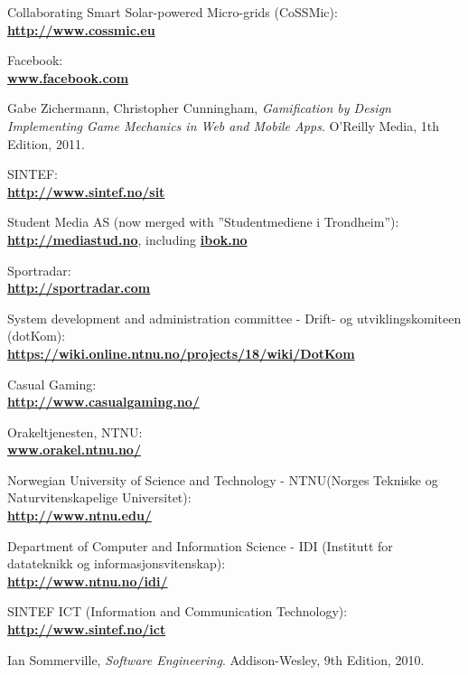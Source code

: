 \begin{thebibliography}{1}

 Collaborating Smart Solar-powered Micro-grids (CoSSMic):\\ \textbf{\url{http://www.cossmic.eu}}

 Facebook: \\
\textbf{ \url{www.facebook.com}}

  Gabe Zichermann, Christopher Cunningham,
  \emph{
Gamification by Design\\
Implementing Game Mechanics in Web and Mobile Apps}.
  O'Reilly Media,
  1th Edition,
  2011.

 SINTEF: \\
\textbf{ \url{ http://www.sintef.no/sit}}

 Student Media AS (now merged with ''Studentmediene i Trondheim''):\\
\textbf{ \url{http://mediastud.no}}, including \textbf{ \url{ibok.no}}

 Sportradar:\\
\textbf{ \url{http://sportradar.com}}

 System development and administration committee - Drift- og utviklingskomiteen (dotKom):\\
\textbf{ \url{https://wiki.online.ntnu.no/projects/18/wiki/DotKom}}

 Casual Gaming:\\
\textbf{ \url{http://www.casualgaming.no/}}

 Orakeltjenesten, NTNU:\\
\textbf{ \url{www.orakel.ntnu.no/}}

 Norwegian University of Science and Technology - NTNU(Norges Tekniske og Naturvitenskapelige Universitet):\\
\textbf{\url{http://www.ntnu.edu/}}

 Department of Computer and Information Science - IDI (Institutt for datateknikk og informasjonsvitenskap):\\
\textbf{ \url{http://www.ntnu.no/idi/}}

 SINTEF ICT (Information and Communication Technology): \\
\textbf{ \url{http://www.sintef.no/ict}}

  Ian Sommerville,
  \emph{Software Engineering}.
  Addison-Wesley,
  9th Edition,
  2010.


\end{thebibliography}
